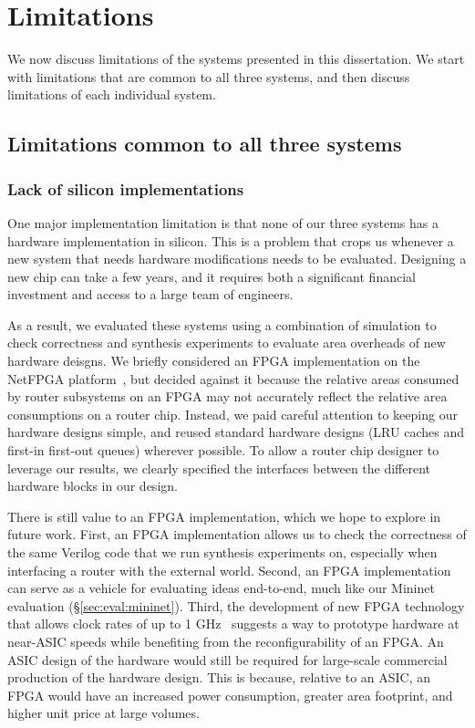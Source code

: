 \chapter{Limitations}
\label{chap:limitations}

We now discuss limitations of the systems presented in this dissertation. We
start with limitations that are common to all three systems, and then discuss
limitations of each individual system.

\section{Limitations common to all three systems}

\subsection{Lack of silicon implementations} One major implementation limitation is
that none of our three systems has a hardware implementation in silicon. This
is a problem that crops us whenever a new system that needs hardware
modifications needs to be evaluated. Designing a new chip can take a few years,
and it requires both a significant financial investment and access to a large
team of engineers.

 As a result, we evaluated these systems using a combination of simulation to
check correctness and synthesis experiments to evaluate area overheads of new
hardware deisgns. We briefly considered an FPGA implementation on the NetFPGA
platform~\cite{netfpga}, but decided against it because the relative areas
consumed by router subsystems on an FPGA may not accurately reflect the
relative area consumptions on a router chip. Instead, we paid careful attention
to keeping our hardware designs simple, and reused standard hardware designs
(\eg LRU caches and first-in first-out queues) wherever possible. To allow a
router chip designer to leverage our results, we clearly specified the
interfaces between the different hardware blocks in our design.

There is still value to an FPGA implementation, which we hope to explore in
future work. First, an FPGA implementation allows us to check the correctness
of the same Verilog code that we run synthesis experiments on, especially when
interfacing a router with the external world. Second, an FPGA implementation
can serve as a vehicle for evaluating ideas end-to-end, much like our Mininet
evaluation (\S\ref{sec:eval:mininet}). Third, the development of new FPGA
technology that allows clock rates of up to 1 GHz~\cite{hyperflex} suggests a
way to prototype hardware at near-ASIC speeds while benefiting from the
reconfigurability of an FPGA. An ASIC design of the hardware would still be
required for large-scale commercial production of the hardware design.  This is
because, relative to an ASIC, an FPGA would have an increased power
consumption, greater area footprint, and higher unit price at large volumes.

